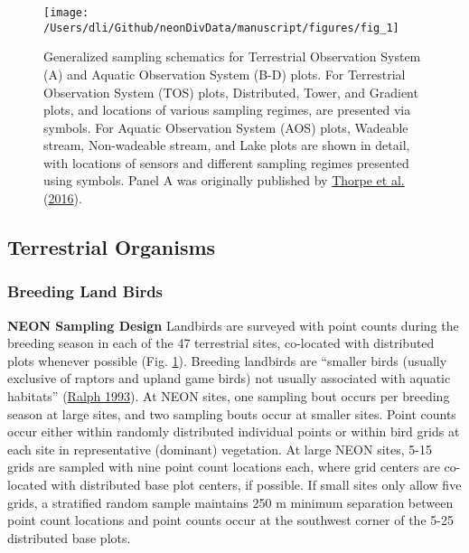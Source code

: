 \documentclass[
  12pt,
]{article}
\begin{document}
\begin{figure}

{\centering \texttt{[image: /Users/dli/Github/neonDivData/manuscript/figures/fig\_1]} 

}

\caption{Generalized sampling schematics for Terrestrial Observation System (A) and Aquatic Observation System (B-D) plots. For Terrestrial Observation System (TOS) plots, Distributed, Tower, and Gradient plots, and locations of various sampling regimes, are presented via symbols. For Aquatic Observation System (AOS) plots, Wadeable stream, Non-wadeable stream, and Lake plots are shown in detail, with locations of sensors and different sampling regimes presented using symbols. Panel A was originally published by \protect\hyperlink{ref-thorpe2016introduction}{Thorpe et al.} (\protect\hyperlink{ref-thorpe2016introduction}{2016}).}\label{fig:Fig1Design}
\end{figure}

\hypertarget{terrestrial-organisms}{%
\subsection{Terrestrial Organisms}\label{terrestrial-organisms}}

\hypertarget{breeding-land-birds}{%
\subsubsection{Breeding Land Birds}\label{breeding-land-birds}}

\textbf{NEON Sampling Design} Landbirds are surveyed with point counts during the breeding season in each of the 47 terrestrial sites, co-located with distributed plots whenever possible (Fig. \ref{fig:Fig1Design}). Breeding landbirds are ``smaller birds (usually exclusive of raptors and upland game birds) not usually associated with aquatic habitats'' (\protect\hyperlink{ref-ralph1993handbook}{Ralph 1993}). At NEON sites, one sampling bout occurs per breeding season at large sites, and two sampling bouts occur at smaller sites. Point counts occur either within randomly distributed individual points or within bird grids at each site in representative (dominant) vegetation. At large NEON sites, 5-15 grids are sampled with nine point count locations each, where grid centers are co-located with distributed base plot centers, if possible. If small sites only allow five grids, a stratified random sample maintains 250 m minimum separation between point count locations and point counts occur at the southwest corner of the 5-25 distributed base plots.
\end{document}

